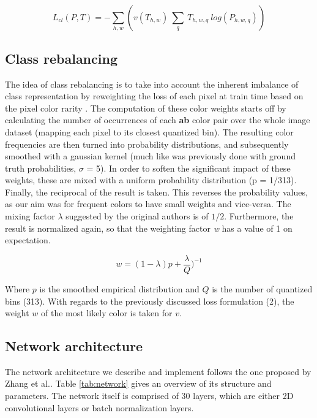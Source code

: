 \documentclass[twoside,twocolumn]{article}
\begin{document}
\begin{equation}
L_{cl}(P,T) = - \sum_{h,w}(v(T_{h,w}) \: \sum_{q} \: T_{h,w,q} \: log(P_{h,w,q}))
\end{equation}

\subsection{Class rebalancing}

The idea of class rebalancing is to take into account the inherent imbalance of class representation by reweighting the loss of each pixel at train time based on the pixel color rarity \cite{Zhang:2016}. The computation of these color weights starts off by calculating the number of occurrences of each \textbf{ab} color pair over the whole image dataset (mapping each pixel to its closest quantized bin). The resulting color frequencies are then turned into probability distributions, and subsequently smoothed with a gaussian kernel (much like was previously done with ground truth probabilities, $\sigma$ = 5). In order to soften the significant impact of these weights, these are mixed with a uniform probability distribution (p = 1/313). Finally, the reciprocal of the result is taken. This reverses the probability values, as our aim was for frequent colors to have small weights and vice-versa. The mixing factor $\lambda$ suggested by the original authors \cite{Zhang:2016} is of $1/2$. Furthermore, the result is normalized again, so that the weighting factor \textit{w} has a value of 1 on expectation.


\begin{equation}
w = (1 - \lambda)p + \frac{\lambda}{Q})^{-1}
\end{equation}

Where $p$ is the smoothed empirical distribution and $Q$ is the number of quantized bins (313). With regards to the previously discussed loss formulation (2), the weight $w$ of the most likely color is taken for $v$.

\subsection{Network architecture}

The network architecture we describe and implement follows the one proposed by Zhang et al.\cite{Zhang:2016}. Table \ref{tab:network} gives an overview of its structure and parameters. The network itself is comprised of 30 layers, which are either 2D convolutional layers or batch normalization layers.
\end{document}
